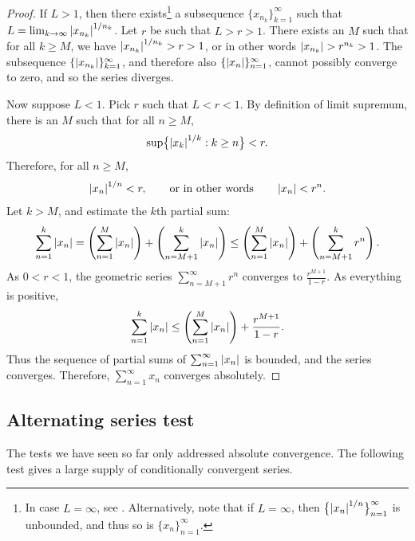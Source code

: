 \begin{proof}
If $L > 1$, then there exists\footnote{%
In case $L=\infty$, see .
Alternatively, note that if $L=\infty$, then $\bigl\{ {\lvert {x_{n}} \rvert}^{1/n}
\bigr\}_{n=1}^\infty$
is unbounded, and thus so is
$\{ x_n \}_{n=1}^\infty$.}
a subsequence $\{ x_{n_k} \}_{k=1}^\infty$ such that
$L = \lim_{k\to\infty} {\lvert {x_{n_k}} \rvert}^{1/n_k}$.  Let
$r$ be such that $L > r > 1$.  There exists an $M$ such
that for all $k \geq M$, we have 
${\lvert {x_{n_k}} \rvert}^{1/n_k} > r > 1$, or in other words
$\lvert {x_{n_k}} \rvert > r^{n_k} > 1$.
The subsequence 
$\{ \lvert {x_{n_k}} \rvert \}_{k=1}^\infty$, and therefore also
$\{ \lvert {x_{n}} \rvert \}_{n=1}^\infty$,
cannot possibly converge to zero, and so the series diverges.

Now suppose $L < 1$.  Pick $r$ such that $L < r < 1$.
By definition of limit supremum,
there is an $M$ such that for all $n \geq M$,
\begin{equation*}
\sup \bigl\{ {\left\lvert {x_k} \right\rvert}^{1/k} : k \geq n \bigr\} < r .
\end{equation*}
Therefore, for all $n \geq M$,
\begin{equation*}
{\left\lvert {x_n} \right\rvert}^{1/n} < r , \qquad \text{or in other words} \qquad \left\lvert {x_n} \right\rvert < r^n .
\end{equation*}
Let $k > M$, and estimate the $k$th partial sum:
\begin{equation*}
\sum_{n=1}^k \left\lvert {x_n} \right\rvert = 
\left( \sum_{n=1}^M \left\lvert {x_n} \right\rvert \right) + 
\left( \sum_{n=M+1}^k \left\lvert {x_n} \right\rvert \right)
\leq
\left( \sum_{n=1}^M \left\lvert {x_n} \right\rvert \right) + 
\left( \sum_{n=M+1}^k r^n \right) .
\end{equation*}
As $0 < r < 1$,
the geometric series $\sum_{n=M+1}^\infty r^n$ converges to
$\frac{r^{M+1}}{1-r}$.  As everything is positive,
\begin{equation*}
\sum_{n=1}^k \left\lvert {x_n} \right\rvert 
\leq
\left( \sum_{n=1}^M \left\lvert {x_n} \right\rvert \right) + 
\frac{r^{M+1}}{1-r} .
\end{equation*}
Thus the sequence of partial sums of $\sum_{n=1}^\infty \left\lvert {x_n} \right\rvert$ is bounded, and
the series converges.  Therefore, $\sum_{n=1}^\infty x_n$ converges absolutely.
\end{proof}

\subsection{Alternating series test}

The tests we have seen so far only addressed absolute convergence.  The
following test gives a large supply of conditionally convergent series.

